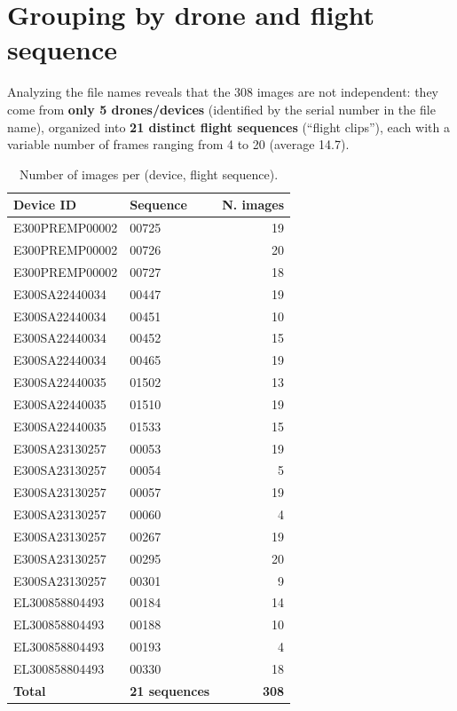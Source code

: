 \documentclass[11pt,a4paper]{article}
\begin{document}
\section{Grouping by drone and flight sequence}

Analyzing the file names reveals that the 308 images are not independent: they come from
\textbf{only 5 drones/devices} (identified by the serial number in the file name), organized
into \textbf{21 distinct flight sequences} (``flight clips''), each with a variable number of
frames ranging from 4 to 20 (average 14.7).

\begin{table}[H]
\centering
\small
\begin{tabular}{llr}
\toprule
\textbf{Device ID} & \textbf{Sequence} & \textbf{N. images} \\
\midrule
E300PREMP00002 & 00725 & 19 \\
E300PREMP00002 & 00726 & 20 \\
E300PREMP00002 & 00727 & 18 \\
E300SA22440034 & 00447 & 19 \\
E300SA22440034 & 00451 & 10 \\
E300SA22440034 & 00452 & 15 \\
E300SA22440034 & 00465 & 19 \\
E300SA22440035 & 01502 & 13 \\
E300SA22440035 & 01510 & 19 \\
E300SA22440035 & 01533 & 15 \\
E300SA23130257 & 00053 & 19 \\
E300SA23130257 & 00054 & 5 \\
E300SA23130257 & 00057 & 19 \\
E300SA23130257 & 00060 & 4 \\
E300SA23130257 & 00267 & 19 \\
E300SA23130257 & 00295 & 20 \\
E300SA23130257 & 00301 & 9 \\
EL300858804493 & 00184 & 14 \\
EL300858804493 & 00188 & 10 \\
EL300858804493 & 00193 & 4 \\
EL300858804493 & 00330 & 18 \\
\midrule
\textbf{Total} & \textbf{21 sequences} & \textbf{308} \\
\bottomrule
\end{tabular}
\caption{Number of images per (device, flight sequence).}
\label{tab:groups}
\end{table}
\end{document}
